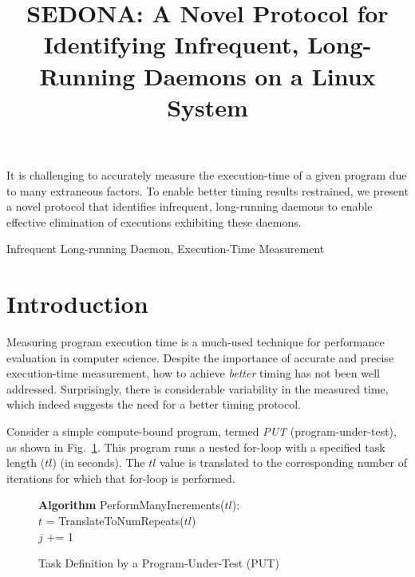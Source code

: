 \documentclass[letter]{ieice}
\title{SEDONA: A Novel Protocol for Identifying Infrequent, Long-Running Daemons on a Linux System}
\begin{document}
\maketitle

\begin{summary}
It is challenging to accurately measure the execution-time of a given
program due to many extraneous factors. To enable better timing results
restrained, we present a novel protocol that identifies infrequent,
long-running daemons to enable effective elimination of executions
exhibiting these daemons.

\end{summary}
\begin{keywords}
Infrequent Long-running Daemon, Execution-Time Measurement
\end{keywords}

\section{Introduction}
\label{sec:intro}

Measuring program execution time is a much-used
technique for performance evaluation in computer science. 
Despite the importance of accurate and precise execution-time measurement, 
how to achieve {\em better} timing has not been well addressed. 
Surprisingly, there is considerable variability in the measured time, 
which indeed suggests the need for a better timing protocol.

Consider a simple compute-bound program, termed {\em PUT} (program-under-test), 
as shown in Fig.~\ref{alg:put}. 
This program runs a nested for-loop with a specified task length ($tl$) (in seconds). 
The $tl$ value is translated to the corresponding 
number of iterations for which that for-loop is performed. 

\vspace{-.25in}
\begin{figure}[h]
\begin{center}
\begin{algorithmic}
{\bf Algorithm} PerformManyIncrements($tl$): \\
\STATE $t$ = TranslateToNumRepeats($tl$) \\
		\STATE $j$ += 1 \\
	\ENDFOR 
\ENDFOR 
\end{algorithmic}
\end{center}
\caption{Task Definition by a Program-Under-Test (PUT)\label{alg:put}}
\vspace{-.25in}
\end{figure}
\end{document}

